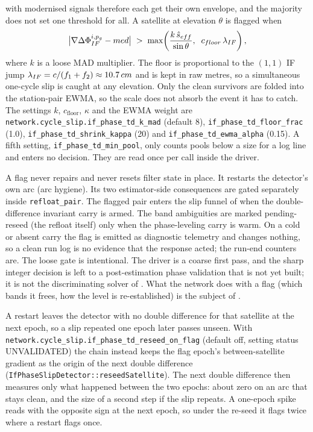 \documentclass[main.tex]{subfiles}
\begin{document}
with modernised signals therefore each get their own envelope, and the
majority does not set one threshold for all.  A satellite at elevation
$\theta$ is flagged when
\begin{equation}
\bigl|\nabla\Delta \Phi^{i,p_{g}}_{IF} - med\bigr|
\;>\;
\max\!\left(\frac{k\,\hat s_{eff}}{\sin\theta},
\;\; c_{floor}\,\lambda_{IF}\right),
\label{eq:if-flag}
\end{equation}
where $k$ is a loose MAD multiplier.  The floor is proportional to the
$(1,1)$ IF jump $\lamif = \sLight/(f_1+f_2) \approx \SI{10.7}{cm}$ and
is kept in raw metres, so a simultaneous one-cycle slip is caught at any
elevation.  Only the clean survivors are folded into the station-pair
EWMA, so the scale does not absorb the event it has to catch.  The
settings $k$, $c_{\mathrm{floor}}$, $\kappa$ and the EWMA weight are
\texttt{network.cycle\_slip.if\_phase\_td\_k\_mad} (default 8),
\texttt{if\_phase\_td\_floor\_frac} (1.0),
\texttt{if\_phase\_td\_shrink\_kappa} (20) and
\texttt{if\_phase\_td\_ewma\_alpha} (0.15).  A fifth setting,
\texttt{if\_phase\_td\_min\_pool}, only counts pools below a size for a log
line and enters no decision.  They are read once per call inside the
driver.

A flag never repairs and never resets filter state in place.  It
restarts the detector's own arc (arc hygiene).  Its two estimator-side
consequences are gated separately inside \texttt{refloat\_pair}.  The
flagged pair enters the slip funnel of  when the
double-difference invariant carry is armed.  The band ambiguities are
marked pending-reseed (the refloat itself) only when the phase-leveling
carry is warm.  On a cold or absent carry the flag is emitted as
diagnostic telemetry and changes nothing, so a clean run log is no
evidence that the response acted; the run-end counters are.  The loose gate is
intentional.  The driver is a coarse first pass, and the sharp integer
decision is left to a post-estimation phase validation that is not yet
built; it is not the discriminating solver of .
What the network does with a flag (which bands it frees, how the level is
re-established) is the subject of .

A restart leaves the detector with no double difference for that
satellite at the next epoch, so a slip repeated one epoch later passes
unseen.  With \texttt{network.cycle\_slip.if\_phase\_td\_reseed\_on\_flag}
(default off, setting status UNVALIDATED) the chain instead keeps the flag
epoch's between-satellite gradient as the origin of the next double
difference (\texttt{IfPhaseSlipDetector::reseedSatellite}).  The next
double difference then measures only what happened between the two epochs:
about zero on an arc that stays clean, and the size of a second step if the
slip repeats.  A one-epoch spike reads with the opposite sign at the next
epoch, so under the re-seed it flags twice where a restart flags once.
\end{document}

